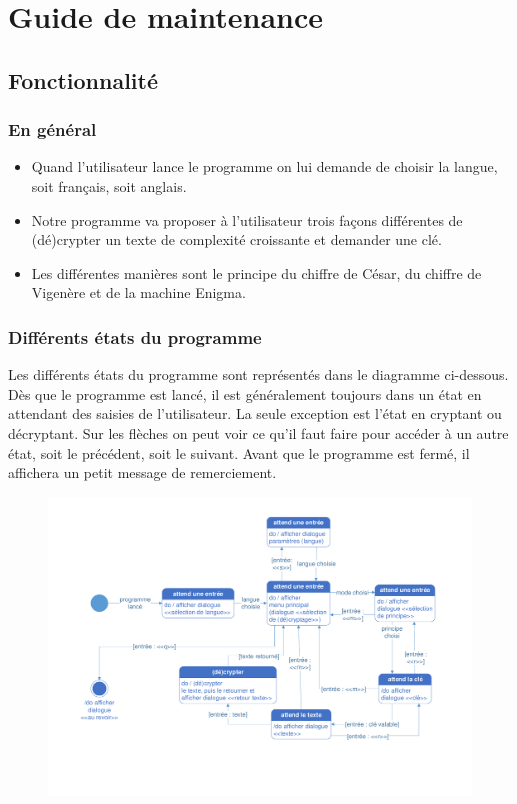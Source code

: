 \documentclass[a4paper,12pt,abstracton,titlepage]{scrartcl}
\begin{document}
\newpage
\section{Guide de maintenance}
\subsection{Fonctionnalité}
\subsubsection{En général}
\begin{itemize}
\item Quand l’utilisateur lance le programme on lui demande de choisir la langue, soit français, soit anglais.
\item Notre programme va proposer à l’utilisateur trois façons différentes de (dé)crypter un texte de complexité croissante et demander une clé.
\item Les différentes manières sont le principe du chiffre de César, du chiffre de Vigenère et de la machine Enigma.
\end{itemize}

\subsubsection{Différents états du programme}
Les différents états du programme sont représentés dans le diagramme ci-dessous. Dès que le programme est lancé, il est généralement toujours dans un état en attendant des saisies de l'utilisateur. La seule exception est l'état en cryptant ou décryptant.
Sur les flèches on peut voir ce qu'il faut faire pour accéder à un autre état, soit le précédent, soit le suivant.
Avant que le programme est fermé, il affichera un petit message de remerciement.\\

\begin{figure}[tpbh]
	\centering
  \includegraphics[width=\textwidth, trim=20mm 25mm 25mm 13mm, clip]{./Diagrammes/diagrammeDesEtats.pdf}
	\label{img:etats}
\end{figure}
\end{document}
